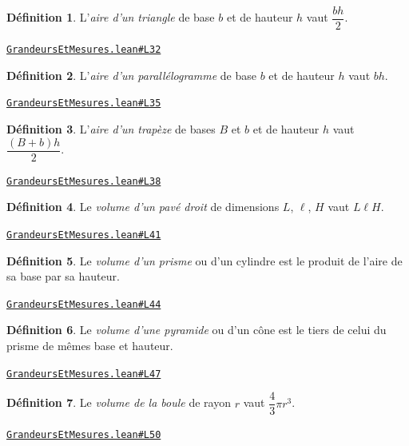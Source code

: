 \documentclass[11pt,a4paper]{article}
\theoremstyle{definition}
\newtheorem{definition}{Définition}
\theoremstyle{plain}
\newcommand{\source}[2]{\par\smallskip\noindent\hfill{\footnotesize\href{#1}{\texttt{#2}}}\par\smallskip}
\begin{document}
\begin{definition}
L'\emph{aire d'un triangle} de base $b$ et de hauteur $h$ vaut $\dfrac{bh}{2}$.
\end{definition}
\source{https://github.com/Commutator-IO/learn-lean/blob/main/courses/01-college/04-grandeurs-et-mesures/GrandeursEtMesures.lean\#L32}{GrandeursEtMesures.lean\#L32}

\begin{definition}
L'\emph{aire d'un parallélogramme} de base $b$ et de hauteur $h$ vaut $bh$.
\end{definition}
\source{https://github.com/Commutator-IO/learn-lean/blob/main/courses/01-college/04-grandeurs-et-mesures/GrandeursEtMesures.lean\#L35}{GrandeursEtMesures.lean\#L35}

\begin{definition}
L'\emph{aire d'un trapèze} de bases $B$ et $b$ et de hauteur $h$ vaut
$\dfrac{(B + b)h}{2}$.
\end{definition}
\source{https://github.com/Commutator-IO/learn-lean/blob/main/courses/01-college/04-grandeurs-et-mesures/GrandeursEtMesures.lean\#L38}{GrandeursEtMesures.lean\#L38}

\begin{definition}
Le \emph{volume d'un pavé droit} de dimensions $L$, $\ell$, $H$ vaut $L\ell H$.
\end{definition}
\source{https://github.com/Commutator-IO/learn-lean/blob/main/courses/01-college/04-grandeurs-et-mesures/GrandeursEtMesures.lean\#L41}{GrandeursEtMesures.lean\#L41}

\begin{definition}
Le \emph{volume d'un prisme} ou d'un cylindre est le produit de l'aire de sa base par
sa hauteur.
\end{definition}
\source{https://github.com/Commutator-IO/learn-lean/blob/main/courses/01-college/04-grandeurs-et-mesures/GrandeursEtMesures.lean\#L44}{GrandeursEtMesures.lean\#L44}

\begin{definition}
Le \emph{volume d'une pyramide} ou d'un cône est le tiers de celui du prisme de mêmes
base et hauteur.
\end{definition}
\source{https://github.com/Commutator-IO/learn-lean/blob/main/courses/01-college/04-grandeurs-et-mesures/GrandeursEtMesures.lean\#L47}{GrandeursEtMesures.lean\#L47}

\begin{definition}
Le \emph{volume de la boule} de rayon $r$ vaut $\dfrac{4}{3}\pi r^3$.
\end{definition}
\source{https://github.com/Commutator-IO/learn-lean/blob/main/courses/01-college/04-grandeurs-et-mesures/GrandeursEtMesures.lean\#L50}{GrandeursEtMesures.lean\#L50}
\end{document}
